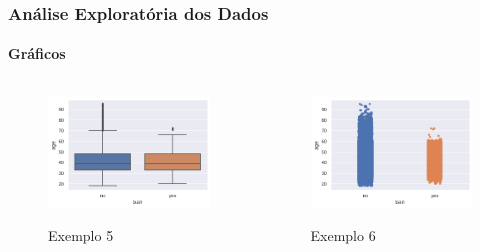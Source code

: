 \documentclass{beamer}
\begin{document}
\begin{frame}
    \frametitle{Análise Exploratória dos Dados}
    \framesubtitle{Gráficos}
    
    
    \begin{columns}
        \begin{column}{0.5\textwidth}
            \begin{figure}[h]
                \caption{Exemplo 5}
                \centering %
                \includegraphics[width=1\textwidth]{IMGS/img5.png}
                \label{figura:distidade}
            \end{figure}
        \end{column}
        \begin{column}{0.5\textwidth}
            \begin{figure}[h]
                \caption{Exemplo 6}
                \centering %
                \includegraphics[width=1\textwidth]{IMGS/img6.png}
                \label{figura:fig4}
            \end{figure}
        \end{column}
        \end{columns} 
          
\end{frame}
    
\end{document}
